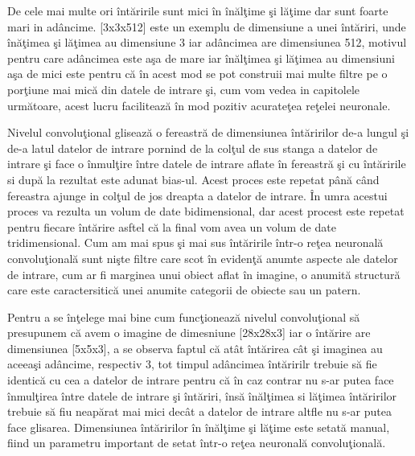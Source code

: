 \par

De cele mai multe ori \^{i}nt\u{a}ririle sunt mici \^{i}n \^{i}n\u{a}l\c{t}ime \c{s}i l\u{a}\c{t}ime dar sunt foarte mari in ad\^{a}ncime. [3x3x512] este un exemplu de dimensiune a unei \^{i}nt\u{a}riri, unde \^{i}n\u{a}\c{t}imea \c{s}i l\u{a}\c{t}imea au dimensiune 3 iar ad\^{a}ncimea are dimensiunea 512, motivul pentru care ad\^{a}ncimea este a\c{s}a de mare iar \^{i}n\u{a}l\c{t}imea \c{s}i l\u{a}\c{t}imea au dimensiuni a\c{s}a de mici  este pentru c\u{a} \^{i}n acest mod se pot construii mai multe filtre pe o por\c{t}iune mai mic\u{a} din datele de intrare \c{s}i, cum vom vedea in capitolele urm\u{a}toare, acest lucru faciliteaz\u{a} \^{i}n mod pozitiv acurate\c{t}ea re\c{t}elei neuronale.

\par

Nivelul convolu\c{t}ional gliseaz\u{a} o fereastr\u{a} de dimensiunea \^{i}nt\u{a}ririlor de-a lungul \c{s}i de-a latul datelor de intrare pornind de la col\c{t}ul de sus stanga a datelor de intrare \c{s}i face o \^{i}nmul\c{t}ire \^{i}ntre  datele de intrare aflate \^{i}n fereastr\u{a} \c{s}i cu \^{i}nt\u{a}ririle si  dup\u{a} la rezultat este adunat bias-ul. Acest proces este repetat p\^{a}n\u{a} c\^{a}nd fereastra ajunge in col\c{t}ul de jos dreapta a datelor de intrare. \^{I}n umra acestui proces va rezulta un volum de date bidimensional, dar acest procest este repetat pentru fiecare \^{i}nt\u{a}rire asftel c\u{a} la final vom avea un volum de date tridimensional. Cum am mai spus \c{s}i mai sus \^{i}nt\u{a}ririle \^{i}ntr-o re\c{t}ea neuronal\u{a} convolu\c{t}ional\u{a} sunt ni\c{s}te filtre care scot \^{i}n eviden\c{t}\u{a} anumte aspecte ale datelor de intrare, cum ar fi marginea unui obiect aflat \^{i}n imagine, o anumit\u{a} structur\u{a} care este caractersitic\u{a} unei anumite categorii de obiecte sau un patern.

\par

Pentru a se \^{i}n\c{t}elege mai bine cum func\c{t}ioneaz\u{a} nivelul convolu\c{t}ional s\u{a} presupunem c\u{a} avem o imagine de dimesniune [28x28x3] iar o \^{i}nt\u{a}rire are dimensiunea [5x5x3], a se observa faptul c\u{a} at\^{a}t  \^{i}nt\u{a}rirea c\^{a}t \c{s}i imaginea au aceea\c{s}i ad\^{a}ncime, respectiv 3, tot timpul ad\^{a}ncimea \^{i}nt\u{a}ririlr trebuie s\u{a} fie identic\u{a} cu cea a datelor de intrare pentru c\u{a} \^{i}n caz contrar nu s-ar putea face \^{i}nmul\c{t}irea \^{i}ntre datele de intrare \c{s}i \^{i}nt\u{a}riri, \^{i}ns\u{a} \^{i}n\u{a}l\c{t}imea si l\u{a}\c{t}imea \^{i}nt\u{a}ririlor trebuie s\u{a} fiu neap\u{a}rat mai mici dec\^{a}t a datelor de intrare altfle nu s-ar putea face glisarea. Dimensiunea \^{i}nt\u{a}ririlor \^{i}n \^{i}n\u{a}l\c{t}ime \c{s}i l\u{a}\c{t}ime este setat\u{a} manual, fiind un parametru important de setat \^{i}ntr-o re\c{t}ea neuronal\u{a} convolu\c{t}ional\u{a}. 

